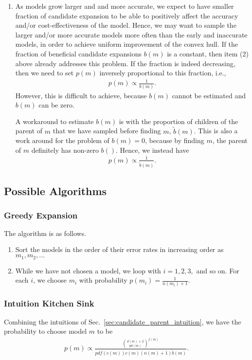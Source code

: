 \begin{enumerate}
\item

As models grow larger and and more accurate, we expect to have smaller fraction of candidate expansion to be able to positively affect the accuracy and/or cost-effectiveness of the model. Hence, we may want to sample the larger and/or more accurate models more often than the early and inaccurate models, in order to achieve uniform improvement of the convex hull. If the fraction of beneficial candidate expansions $b(m)$ is a constant, then item (2) above already addresses this problem. If the fraction is indeed decreasing, then we need to set $p(m)$  inversely proportional to this fraction, i.e.,
\begin{align}
    p(m) \propto \frac{1}{b(m)}.
\end{align} 
However, this is difficult to achieve, because $b(m)$ cannot be estimated and $b(m)$ can be zero. 

A workaround to estimate $b(m)$ is with the proportion of children of the parent of $m$ that we have sampled before finding $m$, $\tilde{b}(m)$. This is also a work around for the problem of $b(m) = 0$, because by finding $m$, the parent of $m$ definitely has non-zero $b()$. 
Hence, we instead have 
\begin{align}
    p(m) \propto \frac{1}{\tilde{b}(m)}.
\end{align}

\end{enumerate}


\subsection{Possible Algorithms}

\subsubsection{Greedy Expansion}
The algorithm is as follows.
\begin{enumerate}
    \item Sort the models in the order of their error rates in increasing order as $m_1, m_2,...$
    \item While we have not chosen a model, we loop with $i =1,2,3,$ and so on. For each $i$, we choose $m_i$ with probability $p(m_i) = \frac{1}{n(m_i) + 1}$. 
\end{enumerate}

\subsubsection{Intuition Kitchen Sink}
Combining the intuitions of Sec.~\ref{sec:candidate_parent_intuition}, we have the probability to choose model $m$ to be 
\begin{align}
    p(m) \propto \frac{ {d(m) + 2 \choose \eta d(m) }^{f(m)} }{pdf(c(m)) c(m) (n(m) + 1) \tilde{b}(m)  }.
\end{align}




%
